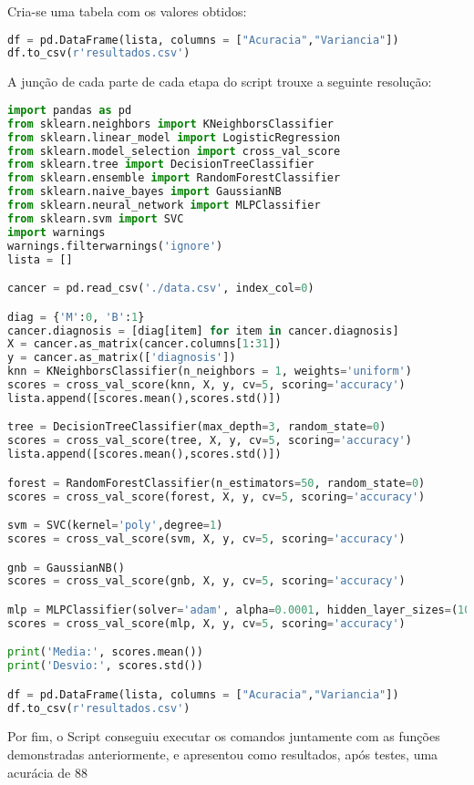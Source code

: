 Cria-se uma tabela com os valores obtidos:
\begin{lstlisting}[language=Python, caption=Resultados]
df = pd.DataFrame(lista, columns = ["Acuracia","Variancia"])
df.to_csv(r'resultados.csv')
\end{lstlisting}

A junção de cada parte de cada etapa do script trouxe a seguinte resolução:
\begin{lstlisting}[language=Python, caption=Código completo]
import pandas as pd
from sklearn.neighbors import KNeighborsClassifier
from sklearn.linear_model import LogisticRegression
from sklearn.model_selection import cross_val_score
from sklearn.tree import DecisionTreeClassifier
from sklearn.ensemble import RandomForestClassifier
from sklearn.naive_bayes import GaussianNB
from sklearn.neural_network import MLPClassifier
from sklearn.svm import SVC
import warnings
warnings.filterwarnings('ignore')
lista = []

cancer = pd.read_csv('./data.csv', index_col=0)

diag = {'M':0, 'B':1}
cancer.diagnosis = [diag[item] for item in cancer.diagnosis]
X = cancer.as_matrix(cancer.columns[1:31])
y = cancer.as_matrix(['diagnosis'])
knn = KNeighborsClassifier(n_neighbors = 1, weights='uniform')
scores = cross_val_score(knn, X, y, cv=5, scoring='accuracy')
lista.append([scores.mean(),scores.std()])

tree = DecisionTreeClassifier(max_depth=3, random_state=0)
scores = cross_val_score(tree, X, y, cv=5, scoring='accuracy')
lista.append([scores.mean(),scores.std()])

forest = RandomForestClassifier(n_estimators=50, random_state=0)
scores = cross_val_score(forest, X, y, cv=5, scoring='accuracy')

svm = SVC(kernel='poly',degree=1)
scores = cross_val_score(svm, X, y, cv=5, scoring='accuracy')

gnb = GaussianNB()
scores = cross_val_score(gnb, X, y, cv=5, scoring='accuracy')

mlp = MLPClassifier(solver='adam', alpha=0.0001, hidden_layer_sizes=(10,20,40), random_state=42, learning_rate='constant', learning_rate_init=0.01, max_iter=100, activation='logistic', momentum=0.9, tol=0.0001)
scores = cross_val_score(mlp, X, y, cv=5, scoring='accuracy')

print('Media:', scores.mean())
print('Desvio:', scores.std())

df = pd.DataFrame(lista, columns = ["Acuracia","Variancia"])
df.to_csv(r'resultados.csv')
\end{lstlisting}

Por fim, o Script conseguiu executar os comandos juntamente com as funções demonstradas anteriormente, e apresentou como resultados, após testes, uma acurácia de 88%



